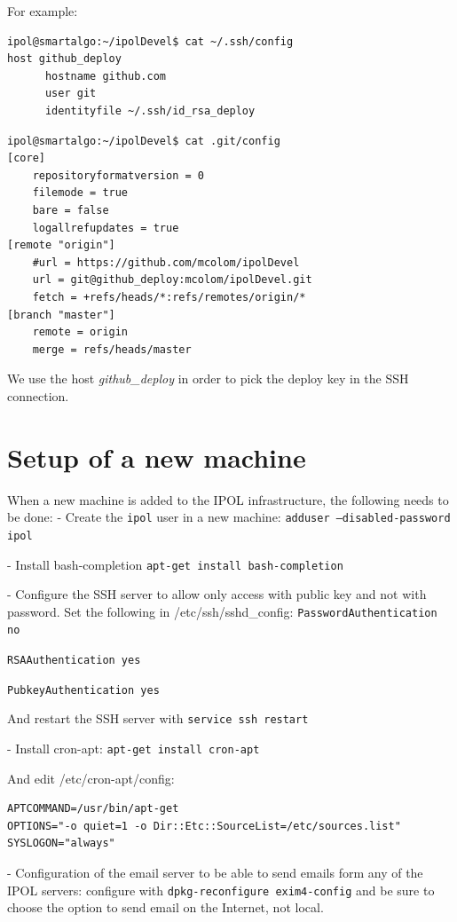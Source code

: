 \documentclass[a4paper,12pt]{article}
\begin{document}
For example:

\begin{verbatim}
ipol@smartalgo:~/ipolDevel$ cat ~/.ssh/config
host github_deploy
      hostname github.com
      user git
      identityfile ~/.ssh/id_rsa_deploy
\end{verbatim}

\vspace{0.15cm}

\begin{verbatim}
ipol@smartalgo:~/ipolDevel$ cat .git/config
[core]
	repositoryformatversion = 0
	filemode = true
	bare = false
	logallrefupdates = true
[remote "origin"]
	#url = https://github.com/mcolom/ipolDevel
	url = git@github_deploy:mcolom/ipolDevel.git
	fetch = +refs/heads/*:refs/remotes/origin/*
[branch "master"]
	remote = origin
	merge = refs/heads/master
\end{verbatim}

We use the host \emph{github\_deploy} in order to pick the deploy key in the SSH connection.

\section{Setup of a new machine}
When a new machine is added to the IPOL infrastructure, the following needs to be done:
- Create the {\tt ipol} user in a new machine: {\tt adduser --disabled-password ipol}

- Install bash-completion {\tt apt-get install bash-completion}

- Configure the SSH server to allow only access with public key and not with password. Set the following in /etc/ssh/sshd\_config:
{\tt PasswordAuthentication no}

{\tt RSAAuthentication yes}

{\tt PubkeyAuthentication yes}

And restart the SSH server with {\tt service ssh restart}

- Install cron-apt: {\tt apt-get install cron-apt}

And edit /etc/cron-apt/config:
\begin{verbatim}
APTCOMMAND=/usr/bin/apt-get
OPTIONS="-o quiet=1 -o Dir::Etc::SourceList=/etc/sources.list"
SYSLOGON="always"
\end{verbatim}

- Configuration of the email server to be able to send emails form any of the IPOL servers: configure with {\tt dpkg-reconfigure exim4-config} and be sure to choose the option to send email on the Internet, not local.
\end{document}
